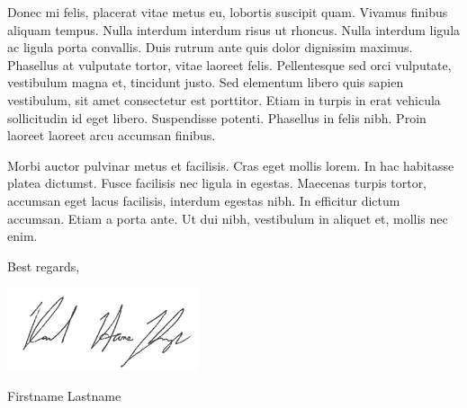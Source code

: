 \documentclass[
  11pt,
]{article}
\begin{document}
Donec mi felis, placerat vitae metus eu, lobortis suscipit quam. Vivamus
finibus aliquam tempus. Nulla interdum interdum risus ut rhoncus. Nulla
interdum ligula ac ligula porta convallis. Duis rutrum ante quis dolor
dignissim maximus. Phasellus at vulputate tortor, vitae laoreet felis.
Pellentesque sed orci vulputate, vestibulum magna et, tincidunt justo.
Sed elementum libero quis sapien vestibulum, sit amet consectetur est
porttitor. Etiam in turpis in erat vehicula sollicitudin id eget libero.
Suspendisse potenti. Phasellus in felis nibh. Proin laoreet laoreet arcu
accumsan finibus.

Morbi auctor pulvinar metus et facilisis. Cras eget mollis lorem. In hac
habitasse platea dictumst. Fusce facilisis nec ligula in egestas.
Maecenas turpis tortor, accumsan eget lacus facilisis, interdum egestas
nibh. In efficitur dictum accumsan. Etiam a porta ante. Ut dui nibh,
vestibulum in aliquet et, mollis nec enim.

Best regards,

\includegraphics[width=0.3\linewidth]{sig_black}

Firstname Lastname
\end{document}
